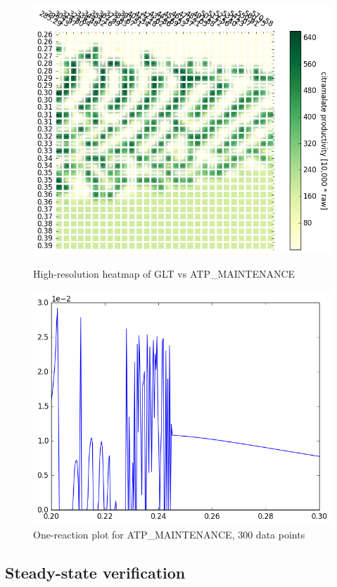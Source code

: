 \documentclass[parskip=full, numbers=noenddot]{scrreprt}
\begin{document}
\begin{figure}[hp]
  \centering
  \includegraphics[scale=0.5]{atpmaintenanceheatmap}
  \caption{High-resolution heatmap of GLT vs ATP\_MAINTENANCE}
  \label{fig:atpmaintenanceheatmap}

  \includegraphics[scale=0.5]{atpmaintenanceonereac}
  \caption{One-reaction plot for ATP\_MAINTENANCE, 300 data points}
  \label{fig:atpmaintenanceonereac}
\end{figure}

\subsection{Steady-state verification}
\label{ssec:steadystate}
\end{document}
